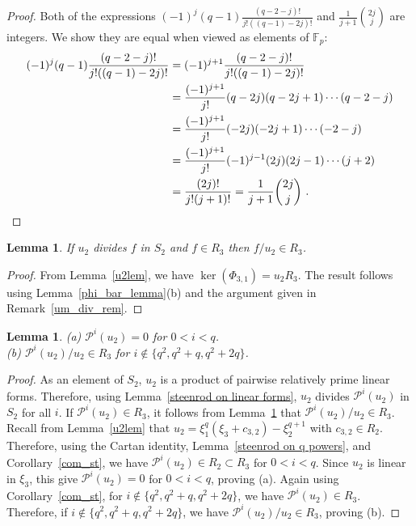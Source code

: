 \documentclass{amsart}
\newcommand{\field}{\mathbb{F}}
\newcommand{\PP}{\mathcal{P}}
\newtheorem{lem}[subsection]{Lemma}
\begin{document}
\begin{proof}
Both of the expressions $(-1)^j(q-1)\frac{(q-2-j)!}{j!((q-1)-2j)!}$ and 
$\frac{1}{j+1}\binom{2j}{j}$ are integers.  We show they are equal when 
viewed as elements of $\field_p$:
\begin{align*}
        (-1)^j (q-1)\frac{(q-2-j)!}{j!((q-1)-2j)!} & =
         (-1)^{j+1}\frac{(q-2-j)!}{j!((q-1)-2j)!}\\
         & =\frac{(-1)^{j+1}}{j!} (q-2j)(q-2j+1)\cdots(q-2-j)\\
         & = \frac{(-1)^{j+1}}{j!} (-2j)(-2j+1)\cdots(-2-j)\\
        & = \frac{(-1)^{j+1}}{j!}(-1)^{j-1} (2j)(2j-1)\cdots(j+2)\\
        & = \frac{(2j)!}{j!(j+1)!} 
         = \frac{1}{j+1}\binom{2j}{j}\ . \qedhere
    \end{align*}

   
\end{proof}

\begin{lem}\label{u2_div_lem}
If $u_2$ divides $f$ in $S_2$ and $f\in R_3$ then $f/u_2\in R_3$.
\end{lem}
\begin{proof} From Lemma~\ref{u2lem}, we have $\ker(\Phi_{3,1})=u_2R_3$.
The result follows using Lemma~\ref{phi_bar_lemma}(b) and the argument given in
Remark~\ref{um_div_rem}.
\end{proof}


\begin{lem} \label{u2_st} (a)  $\PP^i(u_2)=0$ for $0<i<q$.\\
 (b) $\PP^i(u_2)/u_2\in R_3$ for $i\not\in\{q^2,q^2+q,q^2+2q\}$.\\
 \end{lem}
 \begin{proof} As an element of $S_2$, $u_2$ is a product of pairwise relatively prime linear forms. 
 Therefore, using Lemma~\ref{steenrod on linear forms}, $u_2$ divides $\PP^i(u_2)$ in $S_2$ for all $i$.
 If $\PP^i(u_2)\in R_3$, it follows from Lemma~\ref{u2_div_lem} that
 $\PP^i(u_2)/u_2\in R_3$.
 Recall from Lemma~\ref{u2lem} that $u_2=\xi_1^q(\xi_3+c_{3,2})-\xi_2^{q+1}$ with $c_{3,2}\in R_2$.
 Therefore, using the Cartan identity, Lemma~\ref{steenrod on q powers},
 and Corollary~\ref{com_st}, we have $\PP^i(u_2)\in R_2\subset R_3$
 for $0<i<q$. 
 Since $u_2$ is linear in $\xi_3$, this give $\PP^i(u_2)=0$ for $0<i<q$, proving (a).
 Again using Corollary~\ref{com_st}, for $i\not\in\{q^2,q^2+q,q^2+2q\}$, we have $\PP^i(u_2)\in R_3$. 
 Therefore, if $i\not\in\{q^2,q^2+q,q^2+2q\}$, we have
 $\PP^i(u_2)/u_2\in R_3$, proving (b).
 \end{proof}
\end{document}
